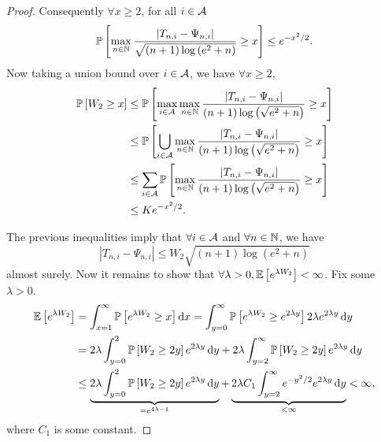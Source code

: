 \begin{proof}
Consequently $\forall x\geq 2$, for all $i \in \mathcal{A}$
\[
    \mathbb{P}\left[\max_{n\in{\mathbb N}}\frac{|T_{n,i}-\Psi_{n,i}|}{\sqrt{\left(n+1\right)\log\left({e^2+n}\right)}}\geq x\right] \leq e^{-x^2/2}.
\]
Now taking a union bound over $i\in\mathcal{A}$, we have $\forall x\geq 2$,
\begin{align*}
    \mathbb{P}\left[W_2\geq x\right] &\leq \mathbb{P}\left[\max_{i\in\mathcal{A}}\max_{n\in{\mathbb N}}\frac{|T_{n,i}-\Psi_{n,i}|}{\left(n+1\right)\log\left(\sqrt{e^2+n}\right)}\geq x\right] \\ 
                 &\leq \mathbb{P}\left[\bigcup_{i\in\mathcal{A}}\max_{n\in{\mathbb N}}\frac{|T_{n,i}-\Psi_{n,i}|}{\left(n+1\right)\log\left(\sqrt{e^2+n}\right)}\geq x\right] \\
                 &\leq \sum_{i\in\mathcal{A}} \mathbb{P}\left[\max_{n\in{\mathbb N}}\frac{|T_{n,i}-\Psi_{n,i}|}{\left(n+1\right)\log\left(\sqrt{e^2+n}\right)}\geq x\right] \\
                 &\leq Ke^{-x^2/2}.
\end{align*}

The previous inequalities imply that $\forall i\in\mathcal{A}$ and $\forall n\in{\mathbb N}$, we have 
\[
    |T_{n,i}-\Psi_{n,i}| \leq W_2\sqrt{(n+1)\log(e^2+n)}
\]
almost surely. Now it remains to show that $\forall \lambda > 0, \mathbb{E}\left[e^{\lambda W_2}\right]<\infty$. Fix some $\lambda > 0$.
\begin{align*}
    \mathbb{E}\left[e^{\lambda W_2}\right] &= \int_{x=1}^{\infty} \mathbb{P}\left[e^{\lambda W_2}\geq x\right] \mathop{}\!\mathrm{d}{x} = \int_{y=0}^{\infty} \mathbb{P}\left[e^{\lambda W_2}\geq e^{2\lambda y}\right]2\lambda e^{2\lambda y} \mathop{}\!\mathrm{d}{y} \\
                       &= 2\lambda \int_{y=0}^{2} \mathbb{P}\left[W_2\geq 2y\right] e^{2\lambda y} \mathop{}\!\mathrm{d}{y} + 2\lambda \int_{y=2}^{\infty} \mathbb{P}\left[W_2\geq 2y\right] e^{2\lambda y} \mathop{}\!\mathrm{d}{y} \\
                       &\leq \underbrace{2\lambda \int_{y=0}^{2} \mathbb{P}\left[W_2\geq 2y\right] e^{2\lambda y} \mathop{}\!\mathrm{d}{y}}_{=e^{4\lambda-1}} + \underbrace{2\lambda C_1 \int_{y=2}^{\infty} e^{-y^2/2} e^{2\lambda y} \mathop{}\!\mathrm{d}{y}}_{<\infty} < \infty,
\end{align*}
where $C_1$ is some constant.


\end{proof}